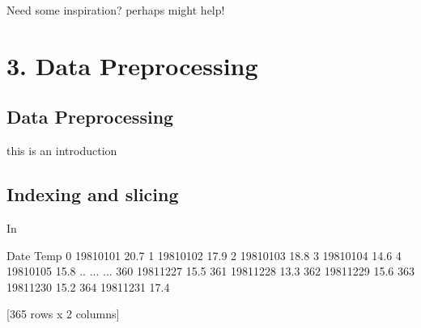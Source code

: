 \documentclass[letterpaper,10pt,english]{jupyterBook}
\begin{document}
\sphinxAtStartPar
Need some inspiration? perhaps  might help!


\part{3. Data Preprocessing}


\chapter{Data Preprocessing}
\label{\detokenize{c3_data_preprocessing/introduction:data-preprocessing}}\label{\detokenize{c3_data_preprocessing/introduction::doc}}
\sphinxAtStartPar
this is an introduction


\chapter{Indexing and slicing}
\label{\detokenize{c3_data_preprocessing/indexing_slicing:indexing-and-slicing}}\label{\detokenize{c3_data_preprocessing/indexing_slicing::doc}}
\sphinxAtStartPar
In

\begin{sphinxVerbatim}[commandchars=\\\{\}]
   
\end{sphinxVerbatim}

\begin{sphinxVerbatim}[commandchars=\\\{\}]
  
\end{sphinxVerbatim}

\begin{sphinxVerbatim}[commandchars=\\\{\}]
           Date  Temp
0    1981\PYGZhy{}01\PYGZhy{}01  20.7
1    1981\PYGZhy{}01\PYGZhy{}02  17.9
2    1981\PYGZhy{}01\PYGZhy{}03  18.8
3    1981\PYGZhy{}01\PYGZhy{}04  14.6
4    1981\PYGZhy{}01\PYGZhy{}05  15.8
..          ...   ...
360  1981\PYGZhy{}12\PYGZhy{}27  15.5
361  1981\PYGZhy{}12\PYGZhy{}28  13.3
362  1981\PYGZhy{}12\PYGZhy{}29  15.6
363  1981\PYGZhy{}12\PYGZhy{}30  15.2
364  1981\PYGZhy{}12\PYGZhy{}31  17.4

[365 rows x 2 columns]
\end{sphinxVerbatim}
\end{document}
